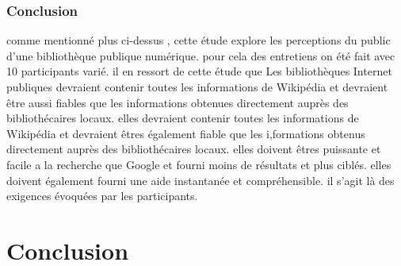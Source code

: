 \documentclass[french,a4paper,12pt]{article}
\begin{document}
\subsubsection{ Conclusion} 
\quad comme mentionné plus ci-dessus , cette étude explore les perceptions du public d'une bibliothèque publique numérique. pour cela des entretiens on été fait avec 10 participants varié. il en ressort de cette étude que Les bibliothèques Internet publiques devraient contenir toutes les informations de Wikipédia et devraient être aussi fiables que les informations obtenues directement auprès des bibliothécaires locaux. elles devraient contenir toutes les informations de Wikipédia et devraient êtres également fiable que les i,formations obtenus directement auprès des bibliothécaires locaux. elles doivent êtres puissante et facile a la recherche que Google et fourni moins de résultats et plus ciblés. elles doivent également fourni une aide instantanée et compréhensible. il s'agit là des exigences évoquées par les participants.










\newpage
\section{Conclusion}






\newpage
\begin{center}
\listoffigures
\end{center}

\newpage

\begin{center}


\end{center}
\end{document}

